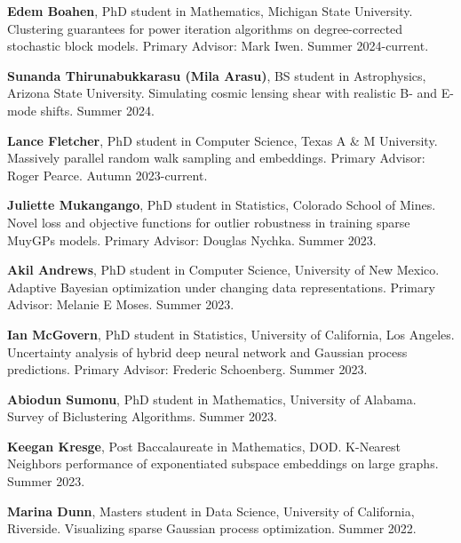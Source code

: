 \begin{innerlist}

  \item[] \textbf{Edem Boahen},
  PhD student in Mathematics,
  Michigan State University.
  Clustering guarantees for power iteration algorithms on degree-corrected
  stochastic block models.
  Primary Advisor: Mark Iwen.
  Summer 2024-current.

  \item[] \textbf{Sunanda Thirunabukkarasu (Mila Arasu)},
  BS student in Astrophysics,
  Arizona State University.
  Simulating cosmic lensing shear with realistic B- and E-mode shifts.
  Summer 2024.

  \item[] \textbf{Lance Fletcher},
  PhD student in Computer Science,
  Texas A \& M University.
  Massively parallel random walk sampling and embeddings.
  Primary Advisor: Roger Pearce.
  Autumn 2023-current.

  \item[] \textbf{Juliette Mukangango},
  PhD student in Statistics,
  Colorado School of Mines.
  Novel loss and objective functions for outlier robustness in training sparse
  MuyGPs models.
  Primary Advisor: Douglas Nychka.
  Summer 2023.

  \item[] \textbf{Akil Andrews},
  PhD student in Computer Science,
  University of New Mexico.
  Adaptive Bayesian optimization under changing data representations.
  Primary Advisor: Melanie E Moses.
  Summer 2023.

  \item[] \textbf{Ian McGovern},
  PhD student in Statistics,
  University of California, Los Angeles.
  Uncertainty analysis of hybrid deep neural network and Gaussian process
  predictions.
  Primary Advisor: Frederic Schoenberg.
  Summer 2023.

  \item[] \textbf{Abiodun Sumonu},
  PhD student in Mathematics,
  University of Alabama.
  Survey of Biclustering Algorithms.
  Summer 2023.

  \item[] \textbf{Keegan Kresge},
  Post Baccalaureate in Mathematics,
  DOD.
  K-Nearest Neighbors performance of exponentiated subspace embeddings on large
  graphs.
  Summer 2023.

  \item[] \textbf{Marina Dunn},
  Masters student in Data Science,
  University of California, Riverside.
  Visualizing sparse Gaussian process optimization.
  Summer 2022.


\end{innerlist}
